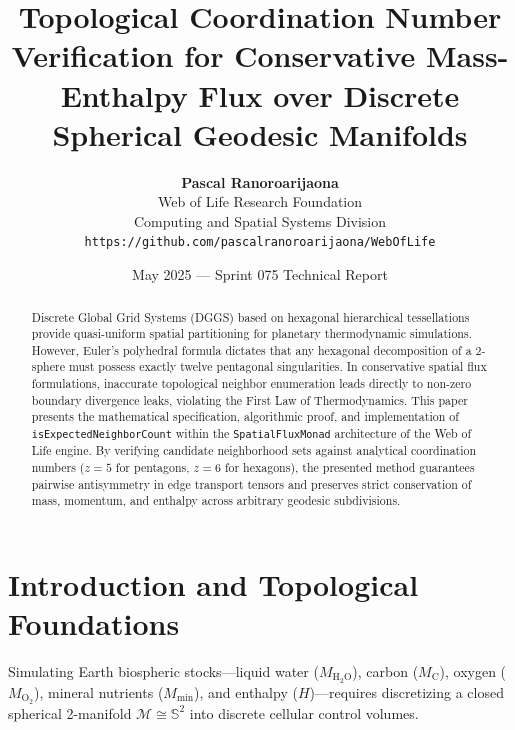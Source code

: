 \documentclass[10pt,twocolumn,letterpaper]{article}
\title{\textbf{Topological Coordination Number Verification for Conservative Mass-Enthalpy Flux over Discrete Spherical Geodesic Manifolds}}
\author{
  \textbf{Pascal Ranoroarijaona} \\
  Web of Life Research Foundation \\
  Computing and Spatial Systems Division \\
  \texttt{https://github.com/pascalranoroarijaona/WebOfLife}
}
\date{May 2025 --- Sprint 075 Technical Report}
\begin{document}
\maketitle

\begin{abstract}
Discrete Global Grid Systems (DGGS) based on hexagonal hierarchical tessellations provide quasi-uniform spatial partitioning for planetary thermodynamic simulations. However, Euler's polyhedral formula dictates that any hexagonal decomposition of a 2-sphere must possess exactly twelve pentagonal singularities. In conservative spatial flux formulations, inaccurate topological neighbor enumeration leads directly to non-zero boundary divergence leaks, violating the First Law of Thermodynamics. This paper presents the mathematical specification, algorithmic proof, and implementation of \texttt{isExpectedNeighborCount} within the \texttt{SpatialFluxMonad} architecture of the Web of Life engine. By verifying candidate neighborhood sets against analytical coordination numbers ($z=5$ for pentagons, $z=6$ for hexagons), the presented method guarantees pairwise antisymmetry in edge transport tensors and preserves strict conservation of mass, momentum, and enthalpy across arbitrary geodesic subdivisions.
\end{abstract}

\section{Introduction and Topological Foundations}

Simulating Earth biospheric stocks---liquid water ($M_{\text{H}_2\text{O}}$), carbon ($M_{\text{C}}$), oxygen ($M_{\text{O}_2}$), mineral nutrients ($M_{\text{min}}$), and enthalpy ($H$)---requires discretizing a closed spherical 2-manifold $\mathcal{M} \cong \mathbb{S}^2$ into discrete cellular control volumes.
\end{document}
